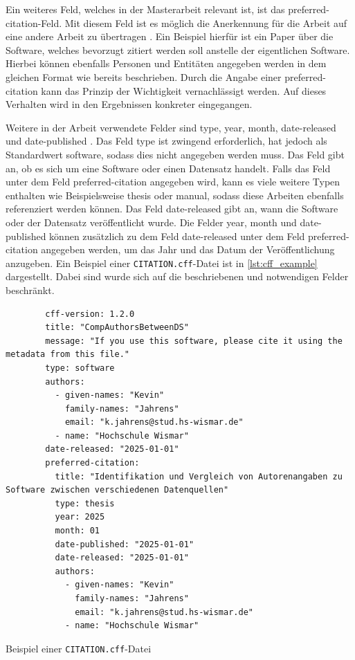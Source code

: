 Ein weiteres Feld, welches in der Masterarbeit relevant ist, ist das \glqq preferred-citation\grqq{}-Feld.
Mit diesem Feld ist es möglich die Anerkennung für die Arbeit auf eine andere Arbeit zu übertragen \autocite{druskat_citation_2021}.
Ein Beispiel hierfür ist ein Paper über die Software, welches bevorzugt zitiert werden soll anstelle der eigentlichen Software.
Hierbei können ebenfalls Personen und Entitäten angegeben werden in dem gleichen Format wie bereits beschrieben.
Durch die Angabe einer \glqq preferred-citation\grqq{} kann das Prinzip der Wichtigkeit vernachlässigt werden.
Auf dieses Verhalten wird in den Ergebnissen konkreter eingegangen.

Weitere in der Arbeit verwendete Felder sind \glqq type\grqq{}, \glqq year\grqq{}, \glqq month\grqq{}, \glqq date-released\grqq{} und \glqq date-published\grqq{} \autocite{druskat_citation_2021}.
Das Feld \glqq type\grqq{} ist zwingend erforderlich, hat jedoch als Standardwert \glqq software\grqq{}, sodass dies nicht angegeben werden muss.
Das Feld gibt an, ob es sich um eine Software oder einen Datensatz handelt.
Falls das Feld unter dem Feld \glqq preferred-citation\grqq{} angegeben wird, kann es viele weitere Typen enthalten wie Beispielsweise \glqq thesis\grqq{} oder \glqq manual\grqq{}, sodass diese Arbeiten ebenfalls referenziert werden können.
Das Feld \glqq date-released\grqq{} gibt an, wann die Software oder der Datensatz veröffentlicht wurde.
Die Felder \glqq year\grqq{}, \glqq month\grqq{} und \glqq date-published\grqq{} können zusätzlich zu dem Feld \glqq date-released\grqq{} unter dem Feld \glqq preferred-citation\grqq{} angegeben werden, um das Jahr und das Datum der Veröffentlichung anzugeben.
Ein Beispiel einer \texttt{CITATION.cff}-Datei ist in \autoref{lst:cff_example} dargestellt.
Dabei sind wurde sich auf die beschriebenen und notwendigen Felder beschränkt.

\begin{listing}
    \begin{verbatim}
        cff-version: 1.2.0
        title: "CompAuthorsBetweenDS"
        message: "If you use this software, please cite it using the metadata from this file."
        type: software
        authors:
          - given-names: "Kevin"
            family-names: "Jahrens"
            email: "k.jahrens@stud.hs-wismar.de"
          - name: "Hochschule Wismar"
        date-released: "2025-01-01"
        preferred-citation:
          title: "Identifikation und Vergleich von Autorenangaben zu Software zwischen verschiedenen Datenquellen"
          type: thesis
          year: 2025
          month: 01
          date-published: "2025-01-01"
          date-released: "2025-01-01"
          authors:
            - given-names: "Kevin"
              family-names: "Jahrens"
              email: "k.jahrens@stud.hs-wismar.de"
            - name: "Hochschule Wismar"
    \end{verbatim}
    \caption{Beispiel einer \texttt{CITATION.cff}-Datei}
    \label{lst:cff_example}
\end{listing}

\subsection{}
\label{subsec:bibtex_format}
